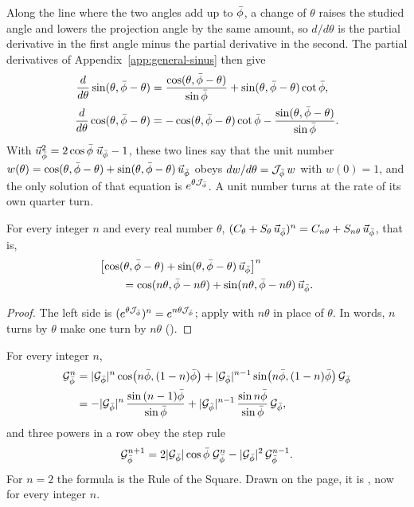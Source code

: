 \begin{remark}\label{rem:gn-euler-derivative}
Along the line where the two angles add up to $\bar{\phi}$, a change of $\theta$ raises the studied angle and lowers the projection angle by the same amount, so $d/d\theta$ is the partial derivative in the first angle minus the partial derivative in the second. The partial derivatives of Appendix~\ref{app:general-sinus} then give
\begin{align*}
\frac{d}{d\theta}\sin(\theta, \bar{\phi} - \theta) &= \frac{\cos(\theta, \bar{\phi} - \theta)}{\sin\bar{\phi}} + \sin(\theta, \bar{\phi} - \theta)\cot\bar{\phi} , \\
\frac{d}{d\theta}\cos(\theta, \bar{\phi} - \theta) &= -\cos(\theta, \bar{\phi} - \theta)\cot\bar{\phi} - \frac{\sin(\theta, \bar{\phi} - \theta)}{\sin\bar{\phi}} .
\end{align*}
With $\vec{u}_{\bar{\phi}}^2 = 2\cos\bar{\phi}\;\vec{u}_{\bar{\phi}} - 1$, these two lines say that the unit number $w(\theta) = \cos(\theta, \bar{\phi} - \theta) + \sin(\theta, \bar{\phi} - \theta)\,\vec{u}_{\bar{\phi}}$ obeys $dw/d\theta = \mathcal{J}_{\bar{\phi}}\,w$ with $w(0) = 1$, and the only solution of that equation is $e^{\theta\mathcal{J}_{\bar{\phi}}}$. A unit number turns at the rate of its own quarter turn.
\end{remark}

\begin{theorem}\label{thm:gn-de-moivre}
For every integer $n$ and every real number $\theta$, $(C_\theta + S_\theta\,\vec{u}_{\bar{\phi}})^n = C_{n\theta} + S_{n\theta}\,\vec{u}_{\bar{\phi}}$, that is,
\begin{align*}
&\bigl[\cos(\theta, \bar{\phi} - \theta) + \sin(\theta, \bar{\phi} - \theta)\,\vec{u}_{\bar{\phi}}\bigr]^n \\
&\qquad = \cos(n\theta, \bar{\phi} - n\theta) + \sin(n\theta, \bar{\phi} - n\theta)\,\vec{u}_{\bar{\phi}} .
\end{align*}
\end{theorem}

\begin{proof}
The left side is $(e^{\theta\mathcal{J}_{\bar{\phi}}})^n = e^{n\theta\mathcal{J}_{\bar{\phi}}}$; apply  with $n\theta$ in place of $\theta$. In words, $n$ turns by $\theta$ make one turn by $n\theta$ ().
\end{proof}

\begin{corollary}\label{cor:gn-powers}
For every integer $n$,
\begin{align*}
\mathcal{G}_{\bar{\phi}}^n &= |\mathcal{G}_{\bar{\phi}}|^n\cos\bigl(n\bar{\phi}, (1 - n)\bar{\phi}\bigr) + |\mathcal{G}_{\bar{\phi}}|^{n-1}\sin\bigl(n\bar{\phi}, (1 - n)\bar{\phi}\bigr)\,\mathcal{G}_{\bar{\phi}} \\
&= -|\mathcal{G}_{\bar{\phi}}|^n\,\frac{\sin\,(n - 1)\bar{\phi}}{\sin\bar{\phi}} + |\mathcal{G}_{\bar{\phi}}|^{n-1}\,\frac{\sin n\bar{\phi}}{\sin\bar{\phi}}\,\mathcal{G}_{\bar{\phi}} ,
\end{align*}
and three powers in a row obey the step rule
\[
\mathcal{G}_{\bar{\phi}}^{n+1} = 2|\mathcal{G}_{\bar{\phi}}|\cos\bar{\phi}\;\mathcal{G}_{\bar{\phi}}^n - |\mathcal{G}_{\bar{\phi}}|^2\,\mathcal{G}_{\bar{\phi}}^{n-1} .
\]
For $n = 2$ the formula is the Rule of the Square. Drawn on the page, it is , now for every integer $n$.
\end{corollary}

